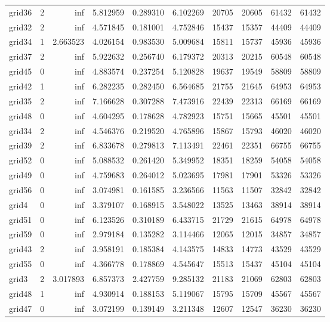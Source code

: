 \begin{longtable}{|l|r|r|r|r|r|r|r|r|r|}
grid36 & 2 & inf & 5.812959 & 0.289310 & 6.102269 & 20705 & 20605 & 61432 & 61432 \\
grid32 & 2 & inf & 4.571845 & 0.181001 & 4.752846 & 15437 & 15357 & 44409 & 44409 \\
grid34 & 1 & 2.663523 & 4.026154 & 0.983530 & 5.009684 & 15811 & 15737 & 45936 & 45936 \\
grid37 & 2 & inf & 5.922632 & 0.256740 & 6.179372 & 20313 & 20215 & 60548 & 60548 \\
grid45 & 0 & inf & 4.883574 & 0.237254 & 5.120828 & 19637 & 19549 & 58809 & 58809 \\
grid42 & 1 & inf & 6.282235 & 0.282450 & 6.564685 & 21755 & 21645 & 64953 & 64953 \\
grid35 & 2 & inf & 7.166628 & 0.307288 & 7.473916 & 22439 & 22313 & 66169 & 66169 \\
grid48 & 0 & inf & 4.604295 & 0.178628 & 4.782923 & 15751 & 15665 & 45501 & 45501 \\
grid34 & 2 & inf & 4.546376 & 0.219520 & 4.765896 & 15867 & 15793 & 46020 & 46020 \\
grid39 & 2 & inf & 6.833678 & 0.279813 & 7.113491 & 22461 & 22351 & 66755 & 66755 \\
grid52 & 0 & inf & 5.088532 & 0.261420 & 5.349952 & 18351 & 18259 & 54058 & 54058 \\
grid49 & 0 & inf & 4.759683 & 0.264012 & 5.023695 & 17981 & 17901 & 53326 & 53326 \\
grid56 & 0 & inf & 3.074981 & 0.161585 & 3.236566 & 11563 & 11507 & 32842 & 32842 \\
grid4 & 0 & inf & 3.379107 & 0.168915 & 3.548022 & 13525 & 13463 & 38914 & 38914 \\
grid51 & 0 & inf & 6.123526 & 0.310189 & 6.433715 & 21729 & 21615 & 64978 & 64978 \\
grid59 & 0 & inf & 2.979184 & 0.135282 & 3.114466 & 12065 & 12015 & 34857 & 34857 \\
grid43 & 2 & inf & 3.958191 & 0.185384 & 4.143575 & 14833 & 14773 & 43529 & 43529 \\
grid55 & 0 & inf & 4.366778 & 0.178869 & 4.545647 & 15513 & 15437 & 45104 & 45104 \\
grid3 & 2 & 3.017893 & 6.857373 & 2.427759 & 9.285132 & 21183 & 21069 & 62803 & 62803 \\
grid48 & 1 & inf & 4.930914 & 0.188153 & 5.119067 & 15795 & 15709 & 45567 & 45567 \\
grid47 & 0 & inf & 3.072199 & 0.139149 & 3.211348 & 12607 & 12547 & 36230 & 36230 \\

\end{longtable}
